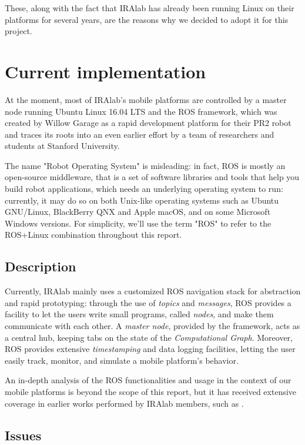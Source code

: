 \documentclass[a4paper,12pt]{report}
\begin{document}
These, along with the fact that IRAlab has already been running Linux on their platforms for several years, are the reasons why we decided to adopt it for this project.

\section{Current implementation}

At the moment, most of IRAlab's mobile platforms are controlled by a master node running Ubuntu Linux 16.04 LTS and the ROS framework, which was created by Willow Garage as a rapid development platform for their PR2 robot and traces its roots into an even earlier effort by a team of researchers and students at Stanford University. 

The name "Robot Operating System" is misleading: in fact, ROS is mostly an open-source middleware, that is a set of software libraries and tools that help you build robot applications, which needs an underlying operating system to run: currently, it may do so on both Unix-like operating systems such as Ubuntu GNU/Linux, BlackBerry QNX \cite{qnx-ros} and Apple macOS, and on some Microsoft Windows versions. For simplicity, we'll use the term "ROS" to refer to the ROS+Linux combination throughout this report.

\subsection{Description}

Currently, IRAlab mainly uses a customized ROS navigation stack for abstraction and rapid prototyping: through the use of \textit{topics} and \textit{messages}, ROS provides a facility to let the users write small programs, called \textit{nodes}, and make them communicate with each other. A \textit{master node}, provided by the framework, acts as a central hub, keeping tabs on the state of the \textit{Computational Graph}. Moreover, ROS provides extensive \textit{timestamping} and data logging facilities, letting the user easily track, monitor, and simulate a mobile platform's behavior.

An in-depth analysis of the ROS functionalities and usage in the context of our mobile platforms is beyond the scope of this report, but it has received extensive coverage in earlier works performed by IRAlab members, such as \textcite{fdila-bs-otto}.

\subsection{Issues}
\end{document}
